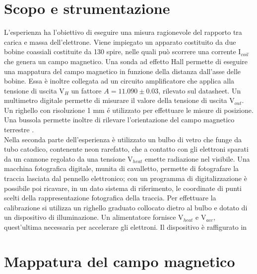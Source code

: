 \section{Scopo e strumentazione}

L'esperienza ha l'obiettivo di eseguire una misura ragionevole del rapporto tra carica e massa dell'elettrone. Viene impiegato un apparato costituito da due bobine coassiali costituite da 130 spire, nelle quali può scorrere una corrente I$_{coil}$ che genera un campo magnetico. Una sonda ad effetto Hall permette di eseguire una mappatura del campo magnetico in funzione della distanza dall'asse delle bobine.  Essa è inoltre collegata ad un circuito amplificatore che applica alla tensione di uscita V$_H$ un fattore $A = 11.090 \pm 0.03$, rilevato sul datasheet. Un multimetro digitale permette di misurare il valore della tensione di uscita V$_{out}$. Un righello con risoluzione 1 mm é utilizzato per effettuare le misure di posizione. Una bussola permette inoltre di rilevare l'orientazione del campo magnetico terrestre .\\ Nella seconda parte dell'esperienza è utilizzato un bulbo di vetro che funge da tubo catodico, contenente neon rarefatto, che a contatto con gli elettroni sparati da un cannone regolato da una tensione V$_{heat }$ emette radiazione nel visibile. Una macchina fotografica digitale, munita di cavalletto, permette di fotografare la traccia lasciata dal pennello elettronico; con un programma di digitalizzazione è possibile poi ricavare, in un dato sistema di riferimento, le coordinate di punti scelti della rappresentazione fotografica della traccia. Per effettuare la calibrazione si utilizza un righello graduato collocato dietro al bulbo e dotato di un dispositivo di illuminazione. Un alimentatore fornisce V$_{heat}$ e V$_{acc}$, quest'ultima necessaria per accelerare gli elettroni. Il dispositivo è raffigurato in 
\section{Mappatura del campo magnetico}

